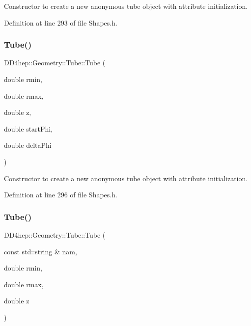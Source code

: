 Constructor to create a new anonymous tube object with attribute initialization. 



Definition at line 293 of file Shapes.\+h.

\hypertarget{class_d_d4hep_1_1_geometry_1_1_tube_a438240ff1fcab0e3e737c57d0e042fc6}{}\label{class_d_d4hep_1_1_geometry_1_1_tube_a438240ff1fcab0e3e737c57d0e042fc6} 
\subsubsection{\texorpdfstring{Tube()}{Tube()}\hspace{0.1cm}{\footnotesize\ttfamily [7/10]}}
{\footnotesize\ttfamily D\+D4hep\+::\+Geometry\+::\+Tube\+::\+Tube (\begin{DoxyParamCaption}\item[{double}]{rmin,  }\item[{double}]{rmax,  }\item[{double}]{z,  }\item[{double}]{start\+Phi,  }\item[{double}]{delta\+Phi }\end{DoxyParamCaption})\hspace{0.3cm}{\ttfamily [inline]}}



Constructor to create a new anonymous tube object with attribute initialization. 



Definition at line 296 of file Shapes.\+h.

\hypertarget{class_d_d4hep_1_1_geometry_1_1_tube_ae031124eb6636f34a07965ca7615c7fa}{}\label{class_d_d4hep_1_1_geometry_1_1_tube_ae031124eb6636f34a07965ca7615c7fa} 
\subsubsection{\texorpdfstring{Tube()}{Tube()}\hspace{0.1cm}{\footnotesize\ttfamily [8/10]}}
{\footnotesize\ttfamily D\+D4hep\+::\+Geometry\+::\+Tube\+::\+Tube (\begin{DoxyParamCaption}\item[{const std\+::string \&}]{nam,  }\item[{double}]{rmin,  }\item[{double}]{rmax,  }\item[{double}]{z }\end{DoxyParamCaption})\hspace{0.3cm}{\ttfamily [inline]}}



